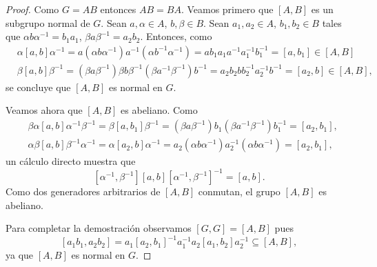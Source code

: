 \begin{proof}
	Como $G=AB$ entonces $AB=BA$. Veamos primero que $[A,B]$ es un subgrupo
	normal de $G$. Sean $a,\alpha\in A$, $b,\beta\in B$. Sean $a_1,a_2\in A$,
	$b_1,b_2\in B$ tales que $\alpha b\alpha^{-1}=b_1a_1$, $\beta
	a\beta^{-1}=a_2b_2$. Entonces, como
	\begin{align*}
		&\alpha[a,b]\alpha^{-1}=a(\alpha b\alpha^{-1})a^{-1}(\alpha b^{-1}\alpha^{-1})=ab_1a_1a^{-1}a_1^{-1}b_1^{-1}=[a,b_1]\in [A,B]\\
		&\beta[a,b]\beta^{-1}=(\beta a\beta^{-1})\beta b\beta^{-1}(\beta a^{-1}\beta^{-1})b^{-1}=a_2b_2bb_2^{-1}a_2^{-1}b^{-1}=[a_2,b]\in [A,B],
	\end{align*}
	se concluye que $[A,B]$ es normal en $G$. 

	Veamos ahora que $[A,B]$ es abeliano. Como 
	\begin{align*}
		&\beta\alpha[a,b]\alpha^{-1}\beta^{-1} = \beta[a,b_1]\beta^{-1}=(\beta a\beta^{-1})b_1(\beta a^{-1}\beta^{-1})b_1^{-1}=[a_2,b_1],\\
		&\alpha\beta[a,b]\beta^{-1}\alpha^{-1} = \alpha[a_2,b]\alpha^{-1}=a_2(\alpha b\alpha^{-1})a_2^{-1}(\alpha b\alpha^{-1})=[a_2,b_1],
	\end{align*}
	un cálculo directo muestra que 
	\[
		[\alpha^{-1},\beta^{-1}][a,b][\alpha^{-1},\beta^{-1}]^{-1}=[a,b].
	\]
	Como dos generadores arbitrarios de $[A,B]$ conmutan, el grupo $[A,B]$ es
	abeliano. 
	
	Para completar la demostración observamos $[G,G]=[A,B]$ pues 
	\[
	[a_1b_1,a_2b_2]=a_1[a_2,b_1]^{-1}a_1^{-1}a_2[a_1,b_2]a_2^{-1}\subseteq [A,B],
	\]
	ya que $[A,B]$ es normal en $G$. 
\end{proof}

